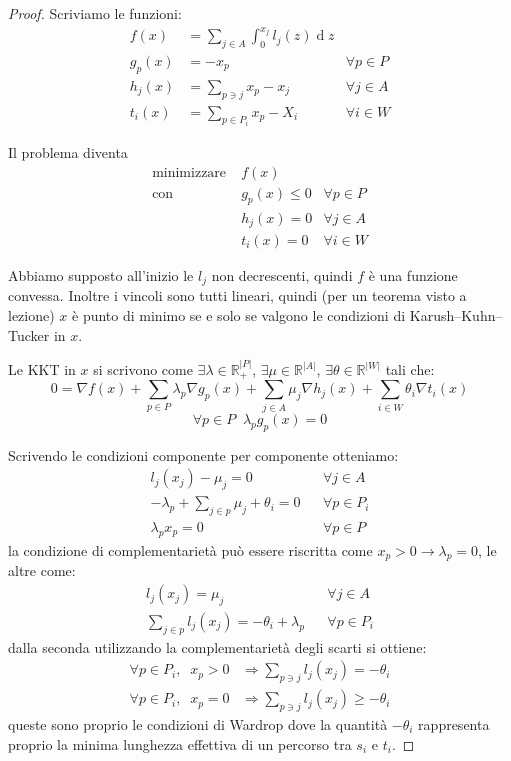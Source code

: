 \documentclass[a4paper]{article}
\theoremstyle{plain}
\theoremstyle{definition}
\theoremstyle{remark}
\newcommand{\abs}[1]{\left|#1\right|}
\DeclareMathOperator{\de}{d}
\begin{document}
\begin{proof}
  Scriviamo le funzioni:
  \begin{align*}
    f(x) &= \sum _{j\in A} \int _0 ^ {x_j} l_j(z)\de z \\
    g_p(x) &= -x_p & \forall p\in P \\
    h_j(x) &= \sum _{p\ni j} x_p -x_j & \forall j\in A\\
    t_i(x) &= \sum _{p\in P_i} x_p - X_i & \forall i\in W
  \end{align*}
  
  Il problema diventa
  \begin{align*}
    \text{minimizzare} \;&  f(x) \\
    \text{con} \;& g_p(x) \le 0 &\forall p \in P \\
                         & h_j(x) = 0 & \forall j\in A\\
                         & t_i(x) = 0 & \forall i\in W
  \end{align*}

  Abbiamo supposto all'inizio le $l_j$ non decrescenti, quindi $f$ è
  una funzione convessa. Inoltre i vincoli sono tutti lineari, quindi
  (per un teorema visto a lezione) $x$ è punto di minimo se e solo se
  valgono le condizioni di Karush–Kuhn–Tucker in $x$.

  Le KKT in $x$ si scrivono come $\exists \lambda \in \mathbb{R}_+^{\abs{P}}$,
  $\exists \mu \in \mathbb{R}^{\abs{A}}$,
  $\exists \theta \in \mathbb{R}^{\abs{W}}$ tali che:
  \[ 0 = \nabla f(x) + \sum_{p\in P}\lambda _p \nabla g_p(x) + \sum _{j\in
      A} \mu _j \nabla h_j(x) + \sum _{i\in W} \theta _i \nabla t_i(x) \]
  \[ \forall p\in P\;\; \lambda _p g_p(x) = 0 \]
  
  Scrivendo le condizioni componente per componente otteniamo:
  \begin{align*}
    l_j(x_j) - \mu _j =0 && \forall j\in A \\
    -\lambda _p + \sum _{j\in p}\mu _j + \theta _i =0 && \forall p \in
                                                      P _i \\
    \lambda _p x_p =0 && \forall p\in P
  \end{align*}
  la condizione di complementarietà può essere riscritta come $x_p > 0
  \rightarrow \lambda _p =0$, le altre come:
  \begin{align*}
    l_j(x_j) = \mu _j && \forall j\in A \\
    \sum _{j\in p}l_j(x_j) = -\theta _i + \lambda _p && \forall p \in
                                                      P _i
  \end{align*}
  dalla seconda utilizzando la complementarietà degli scarti si
  ottiene:
  \begin{align*}
    \forall p\in P_i,\;\; x_p > 0 & \Rightarrow \sum _{p\ni j} l_j(x_j) = -\theta _i \\
    \forall p\in P_i,\;\; x_p = 0 & \Rightarrow \sum _{p\ni j} l_j(x_j) \ge -\theta _i
  \end{align*}
  queste sono proprio le condizioni di Wardrop dove la quantità
  $-\theta _i$ rappresenta proprio la minima lunghezza effettiva di un
  percorso tra $s_i$ e $t_i$.
\end{proof}
\end{document}
